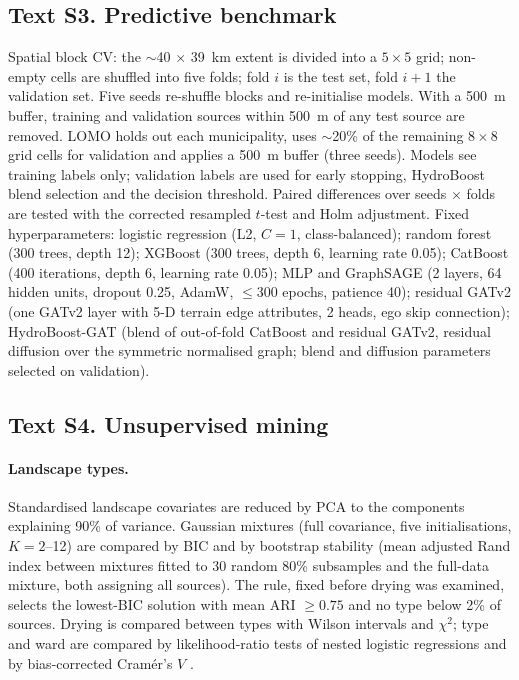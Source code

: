 \subsection*{Text S3. Predictive benchmark}
Spatial block CV: the $\sim$\SI{40}{} $\times$ \SI{39}{\kilo\metre} extent is divided into a $5\times5$ grid; non-empty cells are shuffled into five folds; fold $i$ is the test set, fold $i+1$ the validation set. Five seeds re-shuffle blocks and re-initialise models. With a \SI{500}{\metre} buffer, training and validation sources within \SI{500}{\metre} of any test source are removed. LOMO holds out each municipality, uses $\sim$20\% of the remaining $8\times8$ grid cells for validation and applies a \SI{500}{\metre} buffer (three seeds). Models see training labels only; validation labels are used for early stopping, HydroBoost blend selection and the decision threshold. Paired differences over seeds $\times$ folds are tested with the corrected resampled $t$-test and Holm adjustment. Fixed hyperparameters: logistic regression (L2, $C=1$, class-balanced); random forest (300 trees, depth 12); XGBoost (300 trees, depth 6, learning rate 0.05); CatBoost (400 iterations, depth 6, learning rate 0.05); MLP and GraphSAGE (2 layers, 64 hidden units, dropout 0.25, AdamW, $\le$300 epochs, patience 40); residual GATv2 (one GATv2 layer with 5-D terrain edge attributes, 2 heads, ego skip connection); HydroBoost-GAT (blend of out-of-fold CatBoost and residual GATv2, residual diffusion over the symmetric normalised graph; blend and diffusion parameters selected on validation).

\subsection*{Text S4. Unsupervised mining}
\paragraph{Landscape types.} Standardised landscape covariates are reduced by PCA to the components explaining 90\% of variance. Gaussian mixtures (full covariance, five initialisations, $K=2$--12) are compared by BIC and by bootstrap stability (mean adjusted Rand index between mixtures fitted to 30 random 80\% subsamples and the full-data mixture, both assigning all sources). The rule, fixed before drying was examined, selects the lowest-BIC solution with mean ARI $\geq 0.75$ and no type below 2\% of sources. Drying is compared between types with Wilson intervals and $\chi^2$; type and ward are compared by likelihood-ratio tests of nested logistic regressions and by bias-corrected Cram\'er's $V$ \citep{bergsma2013bias}.
